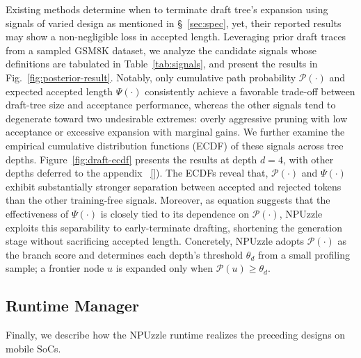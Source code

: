 \documentclass[sigconf,nonacm,10pt]{acmart}
\newcommand{\name}{NPUzzle\xspace}
\begin{document}
{\color{blue}
Existing methods determine when to terminate draft tree's expansion using signals of varied design 
as mentioned in \S~\ref{sec:spec}, yet, their reported results may show a non-negligible loss in accepted length. 
Leveraging prior draft traces from a sampled GSM8K dataset, we analyze the candidate signals  whose definitions are tabulated in Table~\ref{tab:signals}, and present the results in Fig.~\ref{fig:posterior-result}. Notably, only cumulative path probability $\mathcal P(\cdot)$ and expected accepted length $\Psi(\cdot)$ consistently achieve a favorable trade-off between draft-tree size and acceptance performance, whereas the other signals tend to degenerate toward two undesirable extremes: overly aggressive pruning with low acceptance or excessive expansion with marginal gains.
We further examine the empirical cumulative distribution functions (ECDF) of these signals across tree depths. Figure~\ref{fig:draft-ecdf} presents the results at depth $d=4$, with other depths deferred to the {\color{red}appendix ~\ref{}). The ECDFs reveal that, $\mathcal P(\cdot)$ and $\Psi(\cdot)$ exhibit substantially stronger separation between accepted and rejected tokens than the other training-free signals. Moreover, as equation suggests that the effectiveness of $\Psi(\cdot)$ is closely tied to its dependence on $\mathcal P(\cdot)$, \name exploits this separability to early-terminate drafting, shortening the generation stage without sacrificing accepted length.
}
Concretely, \name adopts $\mathcal P(\cdot)$ as the branch score and determines each depth's threshold $\theta_d$ from a small profiling sample; a frontier node $u$ is expanded only when $\mathcal P(u)\geq\theta_d$.


\subsection{Runtime Manager} \label{sec:runtime_manager}
Finally, we describe how the \name runtime realizes the preceding designs on mobile SoCs.

}
\end{document}
